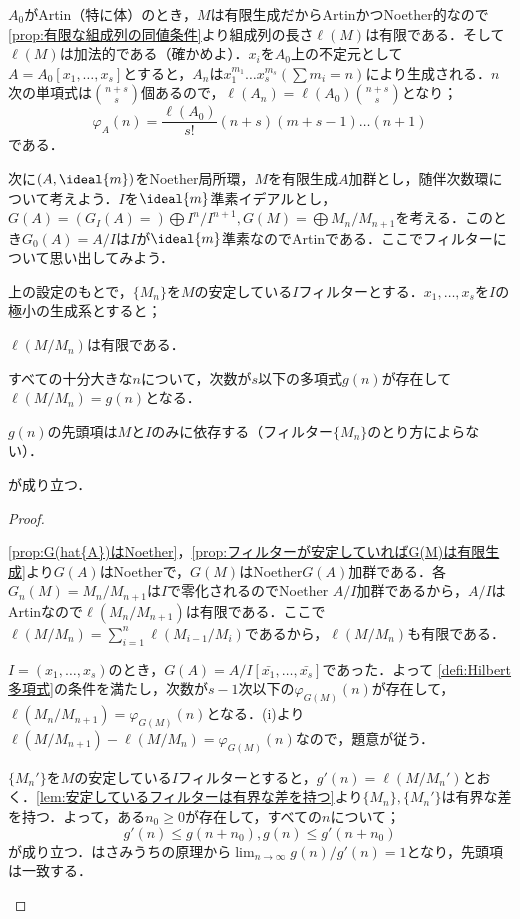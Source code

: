 $A_0$がArtin（特に体）のとき，$M$は有限生成だからArtinかつNoether的なので\ref{prop:有限な組成列の同値条件}より組成列の長さ$\ell(M)$は有限である．そして$\ell(M)$は加法的である（確かめよ）．$x_i$を$A_0$上の不定元として$A=A_0[x_1,\dots,x_s]$とすると，$A_n$は$x_1^{m_1}\dots x_s^{m_s} (\sum m_i=n)$により生成される．$n$次の単項式は$\binom{n+s}{s}$個あるので，$\ell(A_n)=\ell(A_0)\binom{n+s}{s}$となり；
\[\varphi_A(n)=\frac{\ell(A_0)}{s!}(n+s)(m+s-1)\dots(n+1)\]
である．

次に$(A,\ideal{m})$をNoether局所環，$M$を有限生成$A$加群とし，随伴次数環について考えよう．$I$を$\ideal{m}$準素イデアルとし，$G(A)=(G_I(A)=)\bigoplus I^n/I^{n+1},G(M)=\bigoplus M_n/M_{n+1}$を考える．このとき$G_0(A)=A/I$は$I$が$\ideal{m}$準素なのでArtinである．ここでフィルターについて思い出してみよう．

\begin{prop}\label{prop:フィルターとHilbert多項式}
	上の設定のもとで，$\{M_n\}$を$M$の安定している$I$フィルターとする．$x_1,\dots,x_s$を$I$の極小の生成系とすると；
	\begin{sakura}
		\item $\ell(M/M_n)$は有限である．
		\item すべての十分大きな$n$について，次数が$s$以下の多項式$g(n)$が存在して$\ell(M/M_n)=g(n)$となる．
		\item $g(n)$の先頭項は$M$と$I$のみに依存する（フィルター$\{M_n\}$のとり方によらない）．
	\end{sakura}
	が成り立つ．
\end{prop}

\begin{proof}
	\begin{sakura}
		\item \ref{prop:G(hat{A})はNoether}，\ref{prop:フィルターが安定していればG(M)は有限生成}より$G(A)$はNoetherで，$G(M)$はNoether$G(A)$加群である．各$G_n(M)=M_n/M_{n+1}$は$I$で零化されるのでNoether $A/I$加群であるから，$A/I$はArtinなので$\ell(M_n/M_{n+1})$は有限である．ここで$\ell(M/M_n)=\sum_{i=1}^n \ell(M_{i-1}/M_i)$であるから，$\ell(M/M_n)$も有限である．
		\item $I=(x_1,\dots,x_s)$のとき，$G(A)=A/I[\bar{x_1},\dots,\bar{x_s}]$であった．よって \ref{defi:Hilbert多項式}の条件を満たし，次数が$s-1$次以下の$\varphi_{G(M)}(n)$が存在して，$\ell(M_n/M_{n+1})=\varphi_{G(M)}(n)$となる．(i)より$\ell(M/M_{n+1})-\ell(M/M_n)=\varphi_{G(M)}(n)$なので，題意が従う．
		\item $\{M_n'\}$を$M$の安定している$I$フィルターとすると，$g'(n)=\ell(M/M_n')$とおく．\ref{lem:安定しているフィルターは有界な差を持つ}より$\{M_n\},\{M_n'\}$は有界な差を持つ．よって，ある$n_0\geq0$が存在して，すべての$n$について；
		\[g'(n)\leq g(n+n_0),g(n)\leq g'(n+n_0)\]
		が成り立つ．はさみうちの原理から$\lim_{n\to\infty} g(n)/g'(n)=1$となり，先頭項は一致する．
	\end{sakura}
\end{proof}

